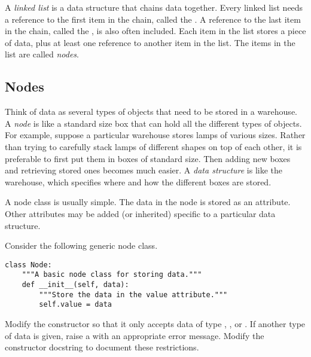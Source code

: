 


A \emph{linked list} is a data structure that chains data together.
Every linked list needs a reference to the first item in the chain, called the .
A reference to the last item in the chain, called the , is also often included.
Each item in the list stores a piece of data, plus at least one reference to another item in the list.
The items in the list are called \emph{nodes}.

\subsection*{Nodes} %

Think of data as several types of objects that need to be stored in a warehouse.
A \emph{node} is like a standard size box that can hold all the different types of objects.
For example, suppose a particular warehouse stores lamps of various sizes.
Rather than trying to carefully stack lamps of different shapes on top of each other, it is preferable to first put them in boxes of standard size.
Then adding new boxes and retrieving stored ones becomes much easier.
A \emph{data structure} is like the warehouse, which specifies where and how the different boxes are stored.

A node class is usually simple.
The data in the node is stored as an attribute.
Other attributes may be added (or inherited) specific to a particular data structure.

\begin{problem} %
Consider the following generic node class.
\begin{lstlisting}
class Node:
    """A basic node class for storing data."""
    def __init__(self, data):
        """Store the data in the value attribute."""
        self.value = data
\end{lstlisting}

Modify the constructor so that it only accepts data of type , , or .
If another type of data is given, raise a  with an appropriate error message.
Modify the constructor docstring to document these restrictions.
\end{problem}

